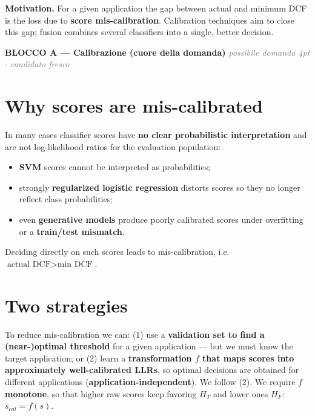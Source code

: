 \textbf{Motivation.} For a given application the gap between actual and minimum DCF is the loss due to \textbf{score mis-calibration}. Calibration techniques aim to close this gap; fusion combines several classifiers into a single, better decision.

\begin{tcolorbox}[colback=green!6, colframe=green!45!black, sharp corners, boxrule=1pt, left=2mm, right=2mm, top=1mm, bottom=1mm, enhanced, breakable]
\textbf{\textcolor{green!45!black}{BLOCCO A --- Calibrazione (cuore della domanda)}} \hfill \textcolor{gray}{\footnotesize\textit{possibile domanda 4pt $\cdot$ candidato fresco}}
\end{tcolorbox}

\section*{Why scores are mis-calibrated}

In many cases classifier scores have \textbf{no clear probabilistic interpretation} and are not log-likelihood ratios for the evaluation population:

\begin{itemize}
\item \textbf{SVM} scores cannot be interpreted as probabilities;
\item strongly \textbf{regularized logistic regression} distorts scores so they no longer reflect class probabilities;
\item even \textbf{generative models} produce poorly calibrated scores under overfitting or a \textbf{train/test mismatch}.
\end{itemize}

Deciding directly on such scores leads to mis-calibration, i.e.\ $\text{actual DCF} > \text{min DCF}$.

\section*{Two strategies}

To reduce mis-calibration we can: (1) use a \textbf{validation set to find a (near-)optimal threshold} for a given application — but we must know the target application; or (2) learn a \textbf{transformation $f$ that maps scores into approximately well-calibrated LLRs}, so optimal decisions are obtained for different applications (\textbf{application-independent}). We follow (2). We require $f$ \textbf{monotone}, so that higher raw scores keep favoring $H_T$ and lower ones $H_F$: $s_{cal} = f(s)$.

